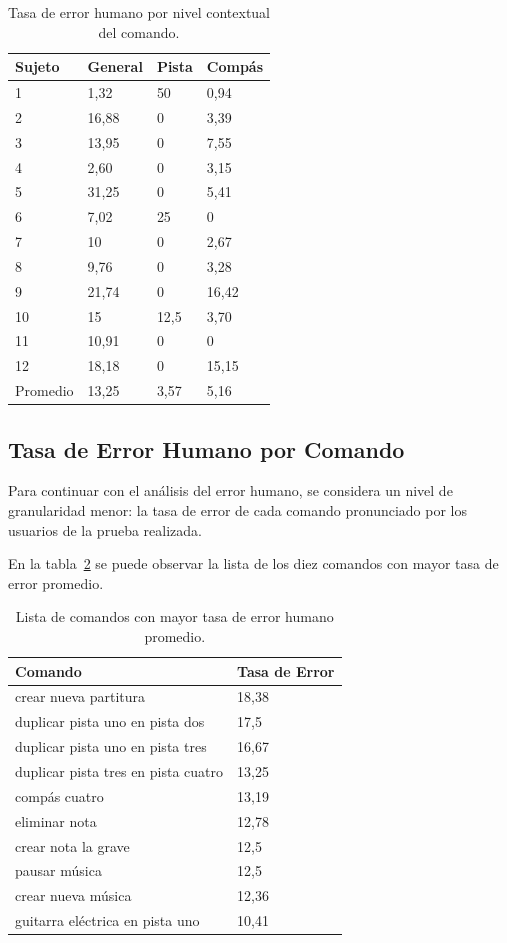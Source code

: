 \begin{table}[H]
\centering
\footnotesize
\begin{tabular}{|p{1.6cm}|p{1.6cm}|p{1.6cm}|p{1.6cm}|}
\hline
    Sujeto & General & Pista & Comp\'as \\
    \hline
1 & 1,32  & 50     & 0,94 \\
2 & 16,88 & 0      & 3,39 \\
3 & 13,95 & 0      & 7,55 \\
4 & 2,60 & 0      & 3,15 \\
5 & 31,25 & 0      & 5,41 \\
6 & 7,02 & 25     & 0 \\
7 & 10     & 0      & 2,67 \\
8 & 9,76 & 0      & 3,28 \\
9 & 21,74 & 0      & 16,42 \\
10 & 15     & 12,5 & 3,70 \\
11 & 10,91 & 0      & 0 \\
12 & 18,18 & 0      & 15,15 \\
\hline
Promedio & 13,25 & 3,57 & 5,16 \\
\hline
\end{tabular}
\caption{Tasa de error humano por nivel contextual del comando.}
\label{sec:error-contexto}
\end{table}


\subsection{Tasa de Error Humano por Comando}
Para continuar con el an\'alisis del error humano, se considera un nivel de granularidad menor:
la tasa de error de cada comando pronunciado por los usuarios de la prueba realizada.

En la tabla~\ref{sec:tabla-lista-comandos-error} se puede observar la lista de los diez comandos 
con mayor tasa de error promedio.

\begin{table}[H]
\centering
\footnotesize
\begin{tabular}{|l|p{3cm}|}
\hline
Comando & Tasa de Error \\
\hline
crear nueva partitura & 18,38 \\
duplicar pista uno en pista dos & 17,5 \\
duplicar pista uno en pista tres & 16,67 \\
duplicar pista tres en pista cuatro & 13,25 \\
comp\'as cuatro & 13,19 \\
eliminar nota & 12,78 \\
crear nota la grave & 12,5 \\
pausar m\'usica & 12,5 \\
crear nueva m\'usica & 12,36 \\
guitarra el\'ectrica en pista uno & 10,41 \\
\hline
\end{tabular}
\caption{Lista de comandos con mayor tasa de error humano promedio.}
\label{sec:tabla-lista-comandos-error}
\end{table}

